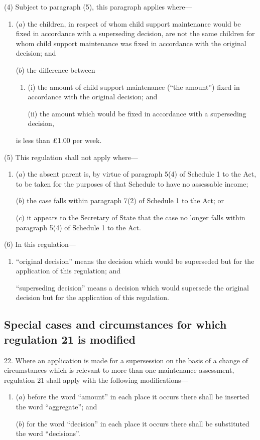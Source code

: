 \documentclass[a4paper,12pt]{article}
\begin{document}
(4) Subject to paragraph (5), this paragraph applies where---
\begin{enumerate}\item[]
($a$) the children, in respect of whom child support maintenance would be fixed in accordance with a superseding decision, are not the same children for whom child support maintenance was fixed in accordance with the original decision; and

($b$) the difference between---
\begin{enumerate}\item[]
(i) the amount of child support maintenance (“the amount”) fixed in accordance with the original decision; and

(ii) the amount which would be fixed in accordance with a superseding decision, 
\end{enumerate}
is less than £1.00 per week.
\end{enumerate}

(5) This regulation shall not apply where---
\begin{enumerate}\item[]
($a$) the absent parent is, by virtue of paragraph 5(4) of Schedule 1 to the Act, to be taken for the purposes of that Schedule to have no assessable income;

($b$) the case falls within paragraph 7(2) of Schedule 1 to the Act; or

($c$) it appears to the Secretary of State that the case no longer falls within paragraph 5(4) of Schedule 1 to the Act.
\end{enumerate}

(6) In this regulation---
\begin{enumerate}\item[]
“original decision” means the decision which would be superseded but for the application of this regulation; and

“superseding decision” means a decision which would supersede the original decision but for the application of this regulation.
\end{enumerate}

\subsection[22. Special cases and circumstances for which regulation 21 is modified]{Special cases and circumstances for which regulation 21 is modified}

22.  Where an application is made for a supersession on the basis of a change of circumstances which is relevant to more than one maintenance assessment, regulation 21 shall apply with the following modifications---
\begin{enumerate}\item[]
($a$) before the word “amount” in each place it occurs there shall be inserted the word “aggregate”; and

($b$) for the word “decision” in each place it occurs there shall be substituted the word “decisions”.
\end{enumerate}
\end{document}
